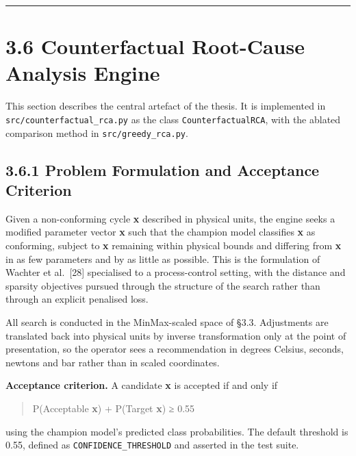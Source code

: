 \begin{center}\rule{0.5\linewidth}{0.5pt}\end{center}

\hypertarget{counterfactual-root-cause-analysis-engine}{%
\section{3.6 Counterfactual Root-Cause Analysis Engine}\label{counterfactual-root-cause-analysis-engine}}

This section describes the central artefact of the thesis. It is implemented in \texttt{src/counterfactual\_rca.py} as the class \texttt{CounterfactualRCA}, with the ablated comparison method in \texttt{src/greedy\_rca.py}.

\hypertarget{problem-formulation-and-acceptance-criterion}{%
\subsection{3.6.1 Problem Formulation and Acceptance Criterion}\label{problem-formulation-and-acceptance-criterion}}

Given a non-conforming cycle \textbf{x} described in physical units, the engine seeks a modified parameter vector \textbf{x}\textquotesingle{} such that the champion model classifies \textbf{x}\textquotesingle{} as conforming, subject to \textbf{x}\textquotesingle{} remaining within physical bounds and differing from \textbf{x} in as few parameters and by as little as possible. This is the formulation of Wachter et al.~{[}28{]} specialised to a process-control setting, with the distance and sparsity objectives pursued through the structure of the search rather than through an explicit penalised loss.

All search is conducted in the MinMax-scaled space of §3.3. Adjustments are translated back into physical units by inverse transformation only at the point of presentation, so the operator sees a recommendation in degrees Celsius, seconds, newtons and bar rather than in scaled coordinates.

\textbf{Acceptance criterion.} A candidate \textbf{x}\textquotesingle{} is accepted if and only if

\begin{quote}
P(Acceptable \textbar{} \textbf{x}\textquotesingle{}) + P(Target \textbar{} \textbf{x}\textquotesingle{}) ≥ 0.55
\end{quote}

using the champion model's predicted class probabilities. The default threshold is 0.55, defined as \texttt{CONFIDENCE\_THRESHOLD} and asserted in the test suite.

